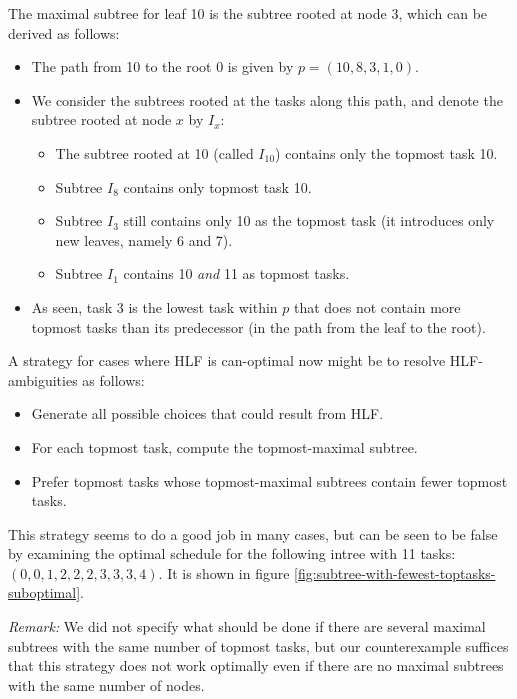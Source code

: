 The maximal subtree for leaf 10 is the subtree rooted at node 3, which can be derived as follows:
\begin{itemize}
\item The path from 10 to the root 0 is given by $p=(10,8,3,1,0)$.
\item We consider the subtrees rooted at the tasks along this path, and denote the subtree rooted at node $x$ by $I_x$:
  \begin{itemize}
  \item The subtree rooted at 10 (called $I_{10}$) contains only the topmost task 10.
  \item Subtree $I_8$ contains only topmost task 10.
  \item Subtree $I_3$ still contains only 10 as the topmost task (it introduces only new leaves, namely 6 and 7).
  \item Subtree $I_1$ contains 10 \emph{and} 11 as topmost tasks.
  \end{itemize}
\item As seen, task 3 is the lowest task within $p$ that does not contain more topmost tasks than its predecessor (in the path from the leaf to the root).
\end{itemize}

A strategy for cases where HLF is can-optimal now might be to resolve HLF-ambiguities as follows:
\begin{itemize}
\item Generate all possible choices that could result from HLF.
\item For each topmost task, compute the topmost-maximal subtree.
\item Prefer topmost tasks whose topmost-maximal subtrees contain fewer topmost tasks.
\end{itemize}


This strategy seems to do a good job in many cases, but can be seen to be false by examining the optimal schedule for the following intree with 11 tasks: $(0,0,1,2,2,2,3,3,3,4)$. It is shown in figure \ref{fig:subtree-with-fewest-toptasks-suboptimal}.

\emph{Remark:} We did not specify what should be done if there are several maximal subtrees with the same number of topmost tasks, but our counterexample suffices that this strategy does not work optimally even if there are no maximal subtrees with the same number of nodes. 

